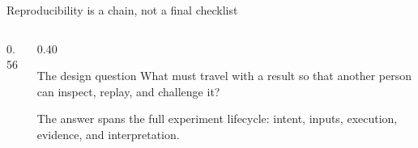 \documentclass[aspectratio=169,11pt]{beamer}
\begin{document}
\begin{frame}[plain]
  \titlepage
\end{frame}

\begin{frame}{Reproducibility is a chain, not a final checklist}
  \begin{columns}[T,onlytextwidth]
    \begin{column}{0.56\textwidth}
      \tableofcontents[hideallsubsections]
    \end{column}
    \begin{column}{0.40\textwidth}
      \begin{block}{The design question}
        What must travel with a result so that another person can inspect, replay,
        and challenge it?
      \end{block}
      \vspace{0.15cm}
      \small
      The answer spans the full experiment lifecycle: intent, inputs, execution,
      evidence, and interpretation.
    \end{column}
  \end{columns}
\end{frame}





\end{document}
